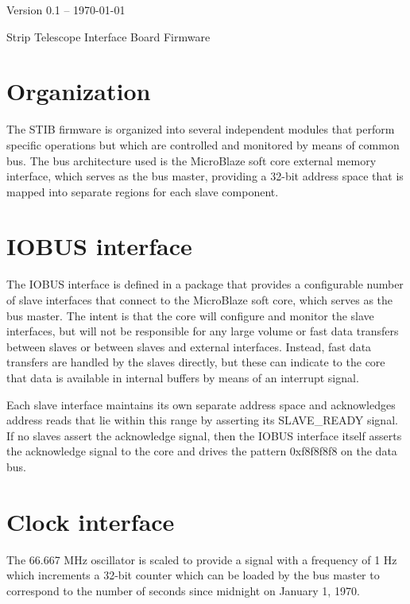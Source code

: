 \documentclass[11pt]{article}
\begin{document}
\begin{flushright}
Version 0.1 -- \today
\end{flushright}
\vspace{2.0cm}

\begin{center}
\begin{Large}
Strip Telescope Interface Board Firmware
\end{Large}
\end{center}

\section{Organization}
The STIB firmware is organized into several independent modules that
perform specific operations but which are controlled and monitored by means
of common bus.  The bus architecture used is the MicroBlaze soft core
external memory interface, which serves as the bus master, providing a
32-bit address space that is mapped into separate regions for each slave
component.

\section{IOBUS interface}
The IOBUS interface is defined in a package that provides a configurable
number of slave interfaces that connect to the MicroBlaze soft core,
which serves as the bus master.  The intent is that the core will configure
and monitor the slave interfaces, but will not be responsible for any
large volume or fast data transfers between slaves or between slaves and
external interfaces.  Instead, fast data transfers are handled by the
slaves directly, but these can indicate to the core that data is available
in internal buffers by means of an interrupt signal.

Each slave interface maintains its own separate address space and
acknowledges address reads that lie within this range by asserting its
SLAVE\_READY signal.  If no slaves assert the acknowledge signal, then the
IOBUS interface itself asserts the acknowledge signal to the core and
drives the pattern 0xf8f8f8f8 on the data bus.

\section{Clock interface}

The 66.667 MHz oscillator is scaled to provide a signal with a frequency
of 1 Hz which increments a 32-bit counter which can be loaded by the
bus master to correspond to the number of seconds since midnight on
January 1, 1970.
\end{document}
